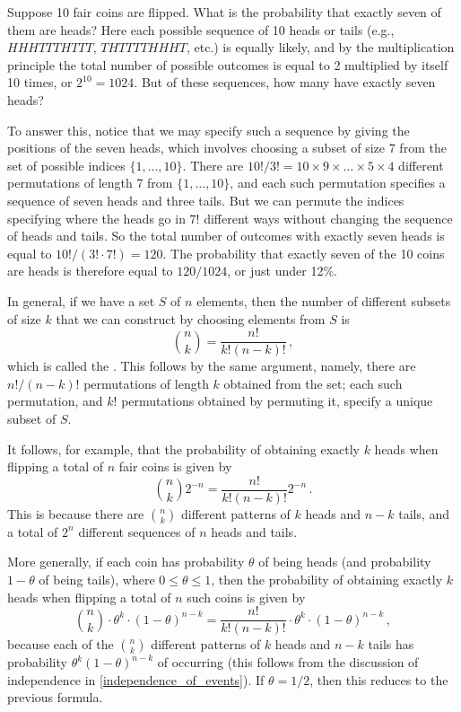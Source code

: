 \begin{example}
    Suppose 10 fair coins are flipped. What is the probability that exactly seven of them are heads? Here each possible sequence of 10 heads or tails (e.g., $HHHTTTHTTT$, $THTTTTHHHT$, etc.) is equally likely, and by the multiplication principle the total number of possible outcomes is equal to 2 multiplied by itself 10 times, or $2^{10}=1024$. But of these sequences, how many have exactly seven heads?

    To answer this, notice that we may specify such a sequence by giving the positions of the seven heads, which involves choosing a subset of size 7 from the set of possible indices $\{1,\dots,10\}$. There are $10!/3!=10\times9\times\dots\times5\times4$ different permutations of length 7 from $\{1,\dots,10\}$, and each such permutation specifies a sequence of seven heads and three tails. But we can permute the indices specifying where the heads go in $7!$ different ways without changing the sequence of heads and tails. So the total number of outcomes with exactly seven heads is equal to $10!/(3!\cdot7!)=120$. The probability that exactly seven of the 10 coins are heads is therefore equal to $120/1024$, or just under 12\%.

    In general, if we have a set $S$ of $n$ elements, then the number of different subsets of size $k$ that we can construct by choosing elements from $S$ is
    $$
        \binom n k = \frac{n!}{k!(n-k)!}\,,
    $$
    which is called the . This follows by the same argument, namely, there are $n!/(n-k)!$ permutations of length $k$ obtained from the set; each such permutation, and $k!$ permutations obtained by permuting it, specify a unique subset of $S$.
\end{example}

It follows, for example, that the probability of obtaining exactly $k$ heads when flipping a total of $n$  fair coins is  given by
$$
    \binom{n}{k}2^{-n} = \frac{n!}{k!(n-k)!}2^{-n}\,.
$$
This is because there are $\binom n k$ different patterns of $k$ heads and $n-k$ tails, and a total of $2^n$ different sequences of $n$  heads and tails.

More generally, if each coin has probability $\theta$ of being heads (and probability $1-\theta$ of being tails), where $0 \leqslant \theta \leqslant 1$, then the probability of obtaining exactly $k$ heads when flipping a total of $n$ such coins is given by
\begin{equation}
    \binom{n}{k}\cdot\theta^k\cdot(1-\theta)^{n-k} = \frac{n!}{k!(n-k)!}\cdot\theta^k\cdot(1-\theta)^{n-k}\,,
\end{equation}
because each of the $\binom{n}{k}$ different patterns of $k$ heads and $n-k$ tails has probability $\theta^k(1-\theta)^{n-k}$ of occurring (this follows from the discussion of independence in \autoref{independence_of_events}). If $\theta=1/2$, then this reduces to the previous formula.

